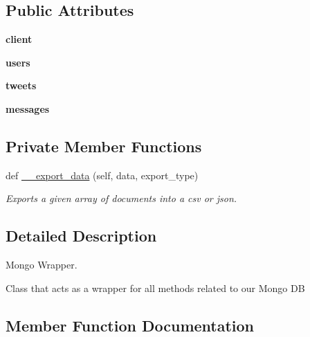 \subsection*{Public Attributes}
\begin{DoxyCompactItemize}
\item 
\mbox{\label{classtwitter_1_1wrappers_1_1mongo__wrapper_1_1MongoAPI_a67a94b824415d1f71214935251f77a58}} 
{\bfseries client}
\item 
\mbox{\label{classtwitter_1_1wrappers_1_1mongo__wrapper_1_1MongoAPI_ad0c0cdc04fa5352dafc6f90f2e39b682}} 
{\bfseries users}
\item 
\mbox{\label{classtwitter_1_1wrappers_1_1mongo__wrapper_1_1MongoAPI_a47a3a708904c23154a9eee64b4b694c9}} 
{\bfseries tweets}
\item 
\mbox{\label{classtwitter_1_1wrappers_1_1mongo__wrapper_1_1MongoAPI_ad7ba1ef520ca7913137e8c2dcfbd26d4}} 
{\bfseries messages}
\end{DoxyCompactItemize}
\subsection*{Private Member Functions}
\begin{DoxyCompactItemize}
\item 
def \hyperlink{classtwitter_1_1wrappers_1_1mongo__wrapper_1_1MongoAPI_a055a4f6364a27238fd68ba3f86391a80}{\+\_\+\+\_\+export\+\_\+data} (self, data, export\+\_\+type)
\begin{DoxyCompactList}\small\item\em Exports a given array of documents into a csv or json. \end{DoxyCompactList}\end{DoxyCompactItemize}


\subsection{Detailed Description}
Mongo Wrapper. 

Class that acts as a wrapper for all methods related to our Mongo DB 

\subsection{Member Function Documentation}
\mbox{\label{classtwitter_1_1wrappers_1_1mongo__wrapper_1_1MongoAPI_a055a4f6364a27238fd68ba3f86391a80}} 
